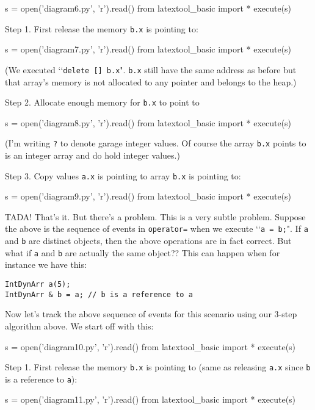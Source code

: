 \begin{python}
s = open('diagram6.py', 'r').read()
from latextool_basic import *
execute(s)
\end{python}

Step 1. First release the memory \verb!b.x! is pointing to:
\begin{python}
s = open('diagram7.py', 'r').read()
from latextool_basic import *
execute(s)
\end{python}
(We executed \lq\lq\verb!delete [] b.x!".
\verb!b.x! still have the same address as before
but that array's memory is not allocated to any pointer
and belongs to the heap.)

Step 2. Allocate enough memory for \verb!b.x! to point to  
\begin{python}
s = open('diagram8.py', 'r').read()
from latextool_basic import *
execute(s)
\end{python}
(I'm writing \verb!?! to denote garage integer values.
Of course the array \verb!b.x! points to is an
integer array and do hold integer values.)

Step 3.
Copy values \verb!a.x! is pointing to array
\verb!b.x! is pointing to:
\begin{python}
s = open('diagram9.py', 'r').read()
from latextool_basic import *
execute(s)
\end{python}

TADA! That's it. But there's a problem.
This is a very subtle problem. 
Suppose the above is the sequence of events in \verb!operator=! when 
we execute \lq\lq \verb!a = b;!".
If \verb!a! and \verb!b! are distinct 
objects, then the above operations are in fact correct. 
But what if \verb!a! and \verb!b!
are actually the same object?? This can happen when 
for instance we have this:

\begin{Verbatim}[frame=single]
IntDynArr a(5);
IntDynArr & b = a; // b is a reference to a
\end{Verbatim}

Now let's track the above sequence of events for this
scenario using our 3-step algorithm above.
We start off with this:
\begin{python}
s = open('diagram10.py', 'r').read()
from latextool_basic import *
execute(s)
\end{python}

Step 1.
First release the memory \verb!b.x! is pointing to
(same as releasing \verb!a.x! since \verb!b!
is a reference to \verb!a!):
\begin{python}
s = open('diagram11.py', 'r').read()
from latextool_basic import *
execute(s)
\end{python}

